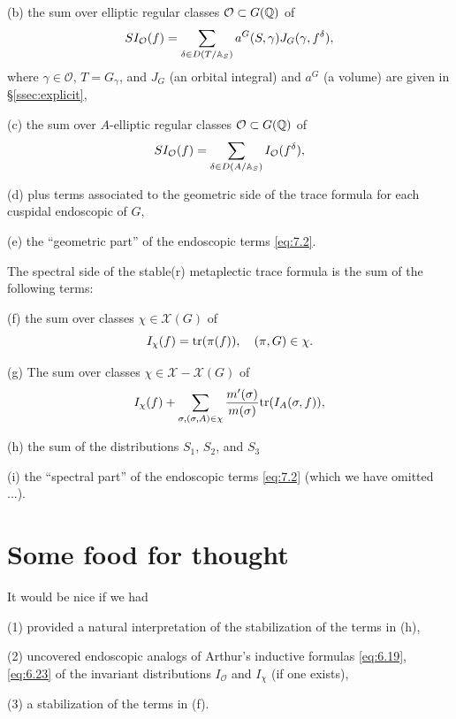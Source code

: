 (b) the sum over elliptic regular classes 
${\mathcal{O}}\subset G(\mathbb{Q} )$
of
\begin{equation}\label{eq:7.27}
SI_{\mathcal{O}}(f)=
\sum_{\delta\in D(T/\mathbb{A} _S)}
a^G(S,\gamma)J_G(\gamma,f^\delta),
\end{equation}
where $\gamma\in {\mathcal{O}}$, $T=G_\gamma$, and
$J_G$ (an orbital integral) and $a^G$ (a volume)
are given in \S\ref{ssec:explicit},

(c)  the sum over $A$-elliptic regular classes
${\mathcal{O}}\subset G(\mathbb{Q} )$
of
\begin{equation}\label{eq:7.28}
SI_{\mathcal{O}}(f)=
\sum_{\delta\in D(A/\mathbb{A} _S)}
I_{\mathcal{O}}(f^\delta),
\end{equation}

(d) plus terms associated to the geometric side of the 
trace formula for each cuspidal endoscopic of $G$,

(e) the ``geometric part'' of the endoscopic terms \eqref{eq:7.2}.

The spectral side of the stable(r) metaplectic
trace formula is the sum of the following terms:

(f) the sum over classes $\chi\in {\mathcal{X}}(G)$ of
\begin{equation}\label{eq:7.29}
I_\chi(f)=
{\rm tr}(\pi(f)),\ \ \ (\pi,G)\in\chi.
\end{equation}

(g) The sum over classes $\chi\in {\mathcal{X}}-{\mathcal{X}}(G)$
of
\begin{equation}\label{eq:7.30}
I_\chi(f)+\sum_{ \sigma,
(\sigma,A)\in\chi}
{m'(\sigma)\over m(\sigma)}
{\rm tr}(I_A(\sigma,f)),
\end{equation}

(h) the sum of the distributions $S_1$, $S_2$, and $S_3$

(i) the ``spectral part'' of the endoscopic terms \eqref{eq:7.2}
(which we have omitted ...).

\section{Some food for thought}

It would be nice if we had

(1) provided a natural interpretation of the
stabilization of the terms in (h),

(2) uncovered endoscopic analogs of Arthur's
inductive formulas \eqref{eq:6.19}, \eqref{eq:6.23} of the invariant
distributions $I_{\mathcal{O}}$ and $I_\chi$ (if one exists),

(3) a stabilization of the terms in (f).


